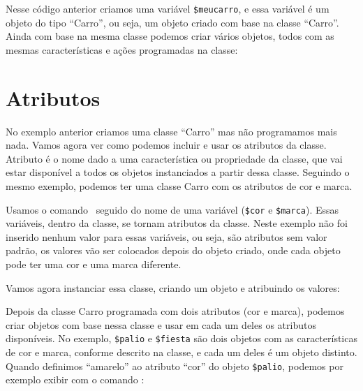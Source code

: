 

Nesse código anterior criamos uma variável \texttt{\$meucarro}, e essa variável é um objeto 
do tipo ``Carro'', ou seja, um objeto criado com base na classe ``Carro''. Ainda com base na mesma 
classe podemos criar vários objetos, todos com as mesmas características e ações programadas 
na classe:



\section{Atributos}
\label{atributos}

No exemplo anterior criamos uma classe ``Carro'' mas não programamos mais nada. Vamos agora 
ver como podemos incluir e usar os atributos da classe. Atributo é o nome dado a uma 
característica ou propriedade da classe, que vai estar disponível a todos os objetos 
instanciados a partir dessa classe. Seguindo o mesmo exemplo, podemos ter uma classe Carro 
com os atributos de cor e marca.



Usamos o comando \comandopublic~seguido do nome de uma variável (\texttt{\$cor} e \texttt{\$marca}). 
Essas variáveis, dentro da classe, se tornam atributos da classe. Neste exemplo não foi 
inserido nenhum valor para essas variáveis, ou seja, são atributos sem valor padrão, os 
valores vão ser colocados depois do objeto criado, onde cada objeto pode ter uma cor e uma 
marca diferente.

Vamos agora instanciar essa classe, criando um objeto e atribuindo os valores:



Depois da classe Carro programada com dois atributos (cor e marca), podemos criar objetos 
com base nessa classe e usar em cada um deles os atributos disponíveis. No exemplo, 
\texttt{\$palio} e \texttt{\$fiesta} são dois objetos com as características de cor e marca, 
conforme descrito na classe, e cada um deles é um objeto distinto. Quando definimos 
``amarelo'' ao atributo ``cor'' do objeto \texttt{\$palio}, podemos por exemplo exibir com 
o comando \funcaoecho:



